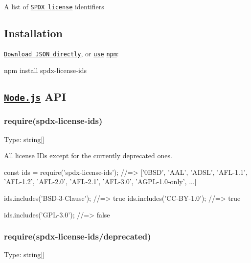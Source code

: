 \href{https://www.npmjs.com/package/spdx-license-ids}{\tt } \href{https://wdp9fww0r9.execute-api.us-west-2.amazonaws.com/production/results/shinnn/spdx-license-ids}{\tt }

A list of \href{https://spdx.org/licenses/}{\tt S\+P\+DX license} identifiers

\subsection*{Installation}

\href{https://raw.githubusercontent.com/shinnn/spdx-license-ids/master/index.json}{\tt Download J\+S\+ON directly}, or \href{https://docs.npmjs.com/cli/install}{\tt use} \href{https://docs.npmjs.com/about-npm/}{\tt npm}\+:


\begin{DoxyCode}
npm install spdx-license-ids
\end{DoxyCode}


\subsection*{\href{https://nodejs.org/}{\tt Node.\+js} A\+PI}

\subsubsection*{require(\textquotesingle{}spdx-\/license-\/ids\textquotesingle{})}

Type\+: {\ttfamily string\mbox{[}\mbox{]}}

All license I\+Ds except for the currently deprecated ones.


\begin{DoxyCode}
const ids = require('spdx-license-ids');
//=> ['0BSD', 'AAL', 'ADSL', 'AFL-1.1', 'AFL-1.2', 'AFL-2.0', 'AFL-2.1', 'AFL-3.0', 'AGPL-1.0-only', ...]

ids.includes('BSD-3-Clause'); //=> true
ids.includes('CC-BY-1.0'); //=> true

ids.includes('GPL-3.0'); //=> false
\end{DoxyCode}


\subsubsection*{require(\textquotesingle{}spdx-\/license-\/ids/deprecated\textquotesingle{})}

Type\+: {\ttfamily string\mbox{[}\mbox{]}}

